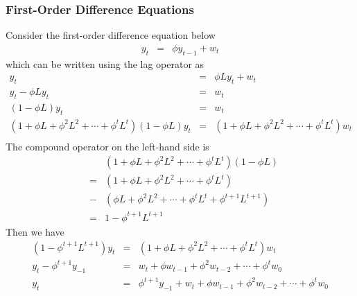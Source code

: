 \subsubsection{First-Order Difference Equations}
Consider the first-order difference equation below
\begin{eqnarray*}
y_{t}&=&\phi y_{t-1}+w_{t}
\end{eqnarray*}
which can be written using the lag operator as
\begin{eqnarray*}
y_{t}&=&\phi Ly_{t}+w_{t}\\
y_{t}-\phi Ly_{t}&=&w_{t}\\
(1-\phi L)y_{t}&=&w_{t}\\
(1+\phi L+\phi^{2}L^{2}+\cdots+\phi^{t}L^{t})(1-\phi L)y_{t}&=&(1+\phi L+\phi^{2}L^{2}+\cdots+\phi^{t}L^{t})w_{t}\\
\end{eqnarray*}
The compound operator on the left-hand side is
\begin{eqnarray*}
&&(1+\phi L+\phi^{2}L^{2}+\cdots+\phi^{t}L^{t})(1-\phi L)\\
&=&(1+\phi L+\phi^{2}L^{2}+\cdots+\phi^{t}L^{t})\\
&-&(\phi L+\phi^{2}L^{2}+\cdots+\phi^{t}L^{t}+\phi^{t+1}L^{t+1})\\
&=&1-\phi^{t+1}L^{t+1}
\end{eqnarray*}
Then we have
\begin{eqnarray*}
(1-\phi^{t+1}L^{t+1})y_{t}&=&(1+\phi L+\phi^{2}L^{2}+\cdots+\phi^{t}L^{t})w_{t}\\
y_{t}-\phi^{t+1}y_{-1}&=&w_{t}+\phi w_{t-1}+\phi^{2}w_{t-2}+\cdots+\phi^{t}w_{0}\\
y_{t}&=&\phi^{t+1}y_{-1}+w_{t}+\phi w_{t-1}+\phi^{2}w_{t-2}+\cdots+\phi^{t}w_{0}
\end{eqnarray*}

